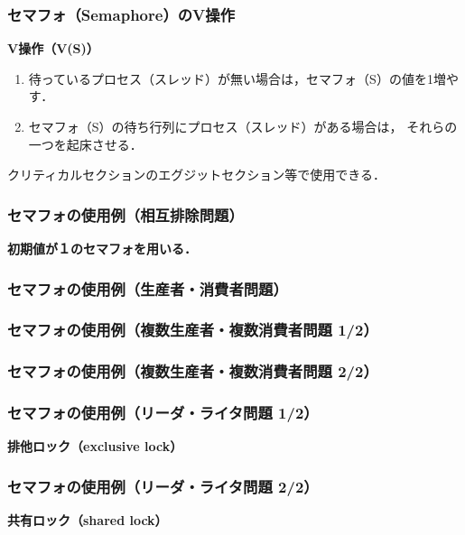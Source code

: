 \documentclass{beamer}                   %
\begin{document}
\begin{frame}
  \frametitle{セマフォ（Semaphore）のV操作}
  {\bf V操作（V(S)）}
  \begin{enumerate}
  \item 待っているプロセス（スレッド）が無い場合は，セマフォ（S）の値を1増やす．
  \item セマフォ（S）の待ち行列にプロセス（スレッド）がある場合は，
    それらの一つを起床させる．
  \end{enumerate}
  クリティカルセクションのエグジットセクション等で使用できる．

  \begin{center}
    \begin{minipage}{0.6\columnwidth}
    \end{minipage}
  \end{center}
\end{frame}

\begin{frame}
  \frametitle{セマフォの使用例（相互排除問題）}
  {\bf 初期値が１のセマフォを用いる．}
\end{frame}

\begin{frame}
  \frametitle{セマフォの使用例（生産者・消費者問題）}
\end{frame}

\begin{frame}
  \frametitle{セマフォの使用例（複数生産者・複数消費者問題 1/2）}
\end{frame}

\begin{frame}
  \frametitle{セマフォの使用例（複数生産者・複数消費者問題 2/2）}
\end{frame}

\begin{frame}
  \frametitle{セマフォの使用例（リーダ・ライタ問題 1/2）}
  {\bf 排他ロック（exclusive lock）}
\end{frame}

\begin{frame}
  \frametitle{セマフォの使用例（リーダ・ライタ問題 2/2）}
  {\bf 共有ロック（shared lock）}
\end{frame}
\end{document}
